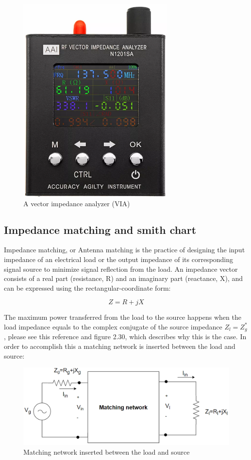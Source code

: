 \begin{figure}[h]
\centering
\includegraphics[scale=0.7]{figures/VIA.PNG}
\caption{A vector impedance analyzer (VIA)}
\end{figure}

\newpage

\subsection{Impedance matching and smith chart}
Impedance matching, or Antenna matching is the practice of designing the input impedance of an electrical load or the output impedance of its corresponding signal source to minimize signal reflection from the load. An impedance vector consists of a real part (resistance, R) and an imaginary part (reactance, X), and can be expressed using the rectangular-coordinate form:

\begin{equation}
   Z = R + jX
\end{equation}

The maximum power transferred from the load to the source happens when the load impedance equals to the complex conjugate of the source impedance $Z_l = Z_g^*$, please see this reference\cite{ImpedanceMatching} and figure 2.30, which describes why this is the case. In order to accomplish this a matching network is inserted between the load and source:

\begin{figure}[h]
\centering
\includegraphics[scale=0.6]{figures/MatchingNetwork.PNG}
\caption{Matching network inserted between the load and source}
\end{figure}

